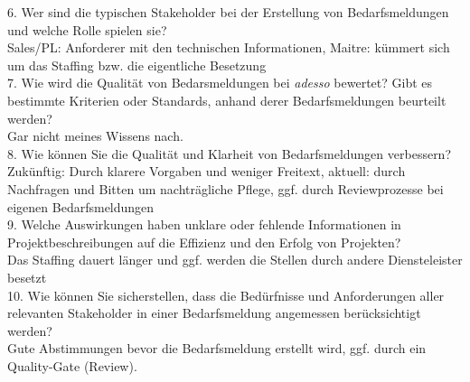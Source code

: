 6. Wer sind die typischen Stakeholder bei der Erstellung von Bedarfsmeldungen und welche Rolle spielen sie?\\
Sales/PL: Anforderer mit den technischen Informationen, Maitre: kümmert sich um das Staffing bzw. die eigentliche Besetzung\\

7. Wie wird die Qualität von Bedarsmeldungen bei \emph{adesso} bewertet? Gibt es bestimmte Kriterien oder Standards, anhand derer Bedarfsmeldungen beurteilt werden?\\
Gar nicht meines Wissens nach.\\

8. Wie können Sie die Qualität und Klarheit von Bedarfsmeldungen verbessern?\\
Zukünftig: Durch klarere Vorgaben und weniger Freitext, aktuell: durch Nachfragen und Bitten um nachträgliche Pflege, ggf. durch Reviewprozesse bei eigenen Bedarfsmeldungen \\

9. Welche Auswirkungen haben unklare oder fehlende Informationen in Projektbeschreibungen auf die Effizienz und den Erfolg von Projekten?\\
Das Staffing dauert länger und ggf. werden die Stellen durch andere Diensteleister besetzt\\

10. Wie können Sie sicherstellen, dass die Bedürfnisse und Anforderungen aller relevanten Stakeholder in einer Bedarfsmeldung angemessen berücksichtigt werden?\\
Gute Abstimmungen bevor die Bedarfsmeldung erstellt wird, ggf. durch ein Quality-Gate (Review).\\
